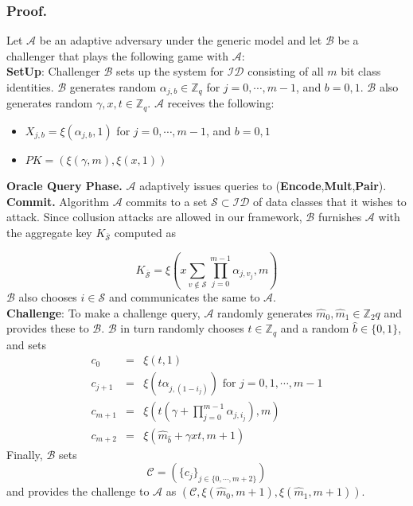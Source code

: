 \subsubsection{Proof.} Let $\mathcal{A}$ be an adaptive adversary under the generic model and let $\mathcal{B}$ be a challenger that plays the following game with $\mathcal{A}$:\\

\noindent\textbf{SetUp}: Challenger $\mathcal{B}$ sets up the system for $\mathcal{ID}$ consisting of all $m$ bit class identities. $\mathcal{B}$ generates random $\alpha_{j,b}\in\mathbb{Z}_q$ for $j=0,\cdots,m-1$, and $b=0,1$. $\mathcal{B}$ also generates random $\gamma,x,t\in\mathbb{Z}_q$. $\mathcal{A}$ receives the following:

\begin{itemize}
 \item $X_{j,b}=\xi({\alpha_{j,b}},1)$ for $j=0,\cdots,m-1$, and $b=0,1$
 \item $PK=(\xi({\gamma},{m}),\xi(x,1))$ 
 
\end{itemize}

\noindent\textbf{Oracle Query Phase.} $\mathcal{A}$ adaptively issues queries to (\textbf{Encode},\textbf{Mult},\textbf{Pair}).\\

\noindent\textbf{Commit.} Algorithm $\mathcal{A}$ commits to a set ${\mathcal{S}} \subset \mathcal{ID}$ of data classes that it wishes to attack. Since collusion attacks are allowed in our framework, $\mathcal{B}$ furnishes $\mathcal{A}$ with the aggregate key $K_{\overline{\mathcal{S}}}$ computed as

\begin{equation}
 K_{\overline{\mathcal{S}}} = \xi\left(x\sum_{v\notin\mathcal{S}}{\prod_{j=0}^{m-1}\alpha_{j,v_j}},m\right)\nonumber
\end{equation}
\noindent $\mathcal{B}$ also chooses $i\in\mathcal{S}$ and communicates the same to $\mathcal{A}$.\\

\noindent\textbf{Challenge}: To make a challenge query, $\mathcal{A}$  randomly generates $\hat{m}_0,\hat{m}_1\in\mathbb{Z}_2q$ and provides these to $\mathcal{B}$. $\mathcal{B}$ in turn randomly chooses $t\in\mathbb{Z}_q$ and a random $\hat{b}\in\{0,1\}$, and sets
\begin{eqnarray}
 c_0&=&\xi(t,1)\nonumber\\
 c_{j+1}&=&\xi(t\alpha_{j,\left(1-i_{j}\right)}) \text{ for } j=0,1,\cdots,m-1\nonumber\\
 c_{m+1}&=&\xi(t(\gamma+\prod_{j=0}^{m-1}\alpha_{j,i_j}),m)\nonumber\\
 c_{m+2}&=& \xi(\hat{m}_{\hat{b}}+\gamma xt,m+1)\nonumber
\end{eqnarray}
\noindent Finally, $\mathcal{B}$ sets 
\begin{equation}
 \mathcal{C}=(\{c_j\}_{j\in\{0,\cdots,m+2\}})\nonumber
\end{equation}
\noindent and provides the challenge to $\mathcal{A}$ as $(\mathcal{C},\xi(\hat{m}_0,m+1),\xi(\hat{m}_1,m+1))$.\\
 
